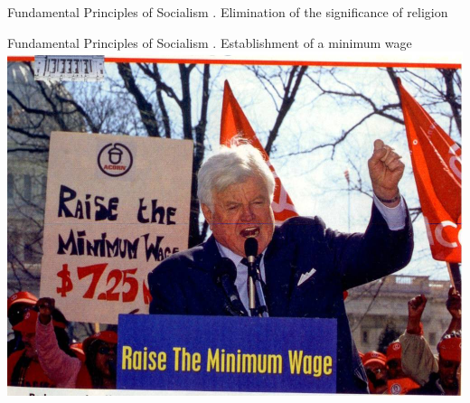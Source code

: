 \begin{frame}{Fundamental Principles of Socialism}
    . Elimination of the significance of religion \\
\end{frame}

\begin{frame}{Fundamental Principles of Socialism}
    . Establishment of a minimum wage \\
    \includegraphics[width=.9\textwidth]{img/wage.jpg} \\
\end{frame}

